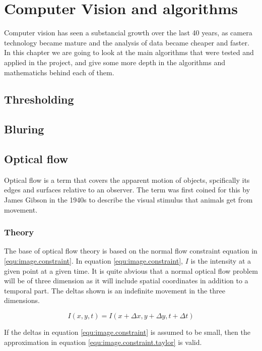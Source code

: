 
\chapter{Computer Vision and algorithms}

Computer vision has seen a substancial growth over the last 40 years, as camera technology became mature 
and the analysis of data became cheaper and faster. In this chapter we are going to look at the main algorithms 
that were tested and applied in the project, and give some more depth in the algorithms and mathematichs behind each of them.

\section{Thresholding}

\section{Bluring}

\section{Optical flow}
Optical flow is a term that covers the apparent motion of objects, spcifically its edges and surfaces 
relative to an observer. The term was first coined for this by James Gibson in the 1940s 
to describe the visual stimulus that animals get from movement\citet{gibson50}.


\subsection{Theory}
The base of optical flow theory is based on the normal flow constraint equation in \eqref{equ:image.constraint}. In equation \eqref{equ:image.constraint}, $I$ is the intensity
at a given point at a given time. It is quite abvious that a normal optical flow problem will be of three dimension as it will include spatial coordinates in addition
to a temporal part. The deltas shown is an indefinite movement in the three dimensions.


\begin{equation}
I(x,y,t) = I(x + \Delta x, y+ \Delta y, t + \Delta t)
\label{equ:image.constraint}
\end{equation}

If the deltas in equation \eqref{equ:image.constraint} is assumed to be small, then the approximation in equation \eqref{equ:image.constraint.taylor} is valid.

